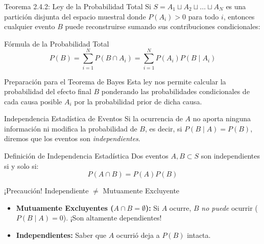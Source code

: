 \documentclass[10pt,aspectratio=169]{beamer}
\begin{document}
\begin{frame}{Teorema 2.4.2: Ley de la Probabilidad Total}
  \small Si $S = A_1 \sqcup A_2 \sqcup \dots \sqcup A_N$ es una partición disjunta del espacio muestral donde $P(A_i) > 0$ para todo $i$, entonces cualquier evento $B$ puede reconstruirse sumando sus contribuciones condicionales: \pause

  \vspace{0.2em}
  \begin{block}{Fórmula de la Probabilidad Total}
    $$P(B) = \sum_{i=1}^{N} P(B \cap A_i) = \sum_{i=1}^{N} P(A_i) P(B \mid A_i)$$
  \end{block}

  \vspace{0.2em}
  \pause
  \begin{alertblock}{Preparación para el Teorema de Bayes}
    Esta ley nos permite calcular la probabilidad del efecto final $B$ ponderando las probabilidades condicionales de cada causa posible $A_i$ por la probabilidad prior de dicha causa.
  \end{alertblock}
\end{frame}

\begin{frame}{Independencia Estadística de Eventos}
  \small Si la ocurrencia de $A$ no aporta ninguna información ni modifica la probabilidad de $B$, es decir, si $P(B \mid A) = P(B)$, diremos que los eventos son \emph{independientes}. \pause

  \vspace{0.2em}
  \begin{block}{Definición de Independencia Estadística}
    Dos eventos $A, B \subset S$ son independientes si y solo si:
    $$P(A \cap B) = P(A) P(B)$$
  \end{block}

  \vspace{0.1em}
  \pause
  \begin{alertblock}{¡Precaución! Independiente $\neq$ Mutuamente Excluyente}
    \begin{itemize}\itemsep=0.1em
      \item \textbf{Mutuamente Excluyentes ($A \cap B = \emptyset$):} Si $A$ ocurre, $B$ \emph{no puede} ocurrir ($P(B \mid A) = 0$). ¡Son altamente dependientes!
      \item \textbf{Independientes:} Saber que $A$ ocurrió deja a $P(B)$ intacta.
    \end{itemize}
  \end{alertblock}
\end{frame}
\end{document}
